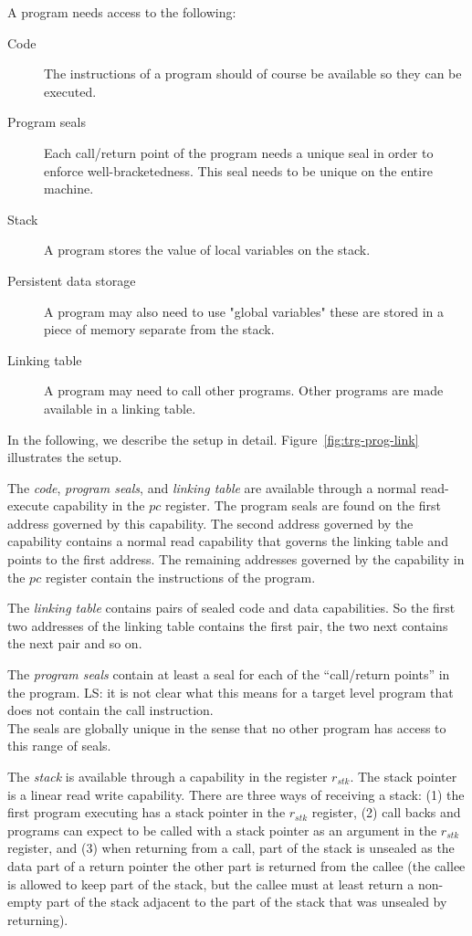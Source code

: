 \documentclass[a3paper]{article}
\newcommand\lau[1]{{\color{purple} \sf \footnotesize {LS: #1}}\\}
\newcommand{\var}[1]{\mathit{#1}}
\newcommand{\pc}{\var{pc}}
\newcommand{\stk}{\var{stk}}
\begin{document}
A program needs access to the following:
\begin{description}
\item[Code] The instructions of a program should of course be available so they can be executed.
\item[Program seals] Each call/return point of the program needs a unique seal in order to enforce well-bracketedness. This seal needs to be unique on the entire machine.
\item[Stack] A program stores the value of local variables on the stack. 
\item[Persistent data storage] A program may also need to use "global variables" these are stored in a piece of memory separate from the stack.
\item[Linking table] A program may need to call other programs. Other programs are made available in a linking table.
\end{description}

In the following, we describe the setup in detail. Figure~\ref{fig:trg-prog-link} illustrates the setup.

The \emph{code}, \emph{program seals}, and \emph{linking table} are available through a normal read-execute capability in the $\pc$ register. The program seals are found on the first address governed by this capability. The second address governed by the capability contains a normal read capability that governs the linking table and points to the first address. The remaining addresses governed by the capability in the $\pc$ register contain the instructions of the program.

The \emph{linking table} contains pairs of sealed code and data capabilities. So the first two addresses of the linking table contains the first pair, the two next contains the next pair and so on.

The \emph{program seals} contain at least a seal for each of the ``call/return points'' in the program.\lau{it is not clear what this means for a target level program that does not contain the call instruction.} The seals are globally unique in the sense that no other program has access to this range of seals.

The \emph{stack} is available through a capability in the register $r_\stk$. The stack pointer is a linear read write capability. There are three ways of receiving a stack: (1) the first program executing has a stack pointer in the $r_\stk$ register, (2) call backs and programs can expect to be called with a stack pointer as an argument in the $r_\stk$ register, and (3) when returning from a call, part of the stack is unsealed as the data part of a return pointer the other part is returned from the callee (the callee is allowed to keep part of the stack, but the callee must at least return a non-empty part of the stack adjacent to the part of the stack that was unsealed by returning).
\end{document}
